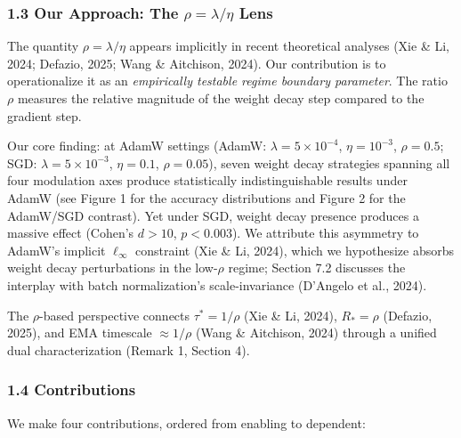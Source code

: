 \documentclass[
]{article}
\begin{document}
\hypertarget{our-approach-the-rho-lambdaeta-lens}{%
\subsubsection{\texorpdfstring{1.3 Our Approach: The
\(\rho = \lambda/\eta\)
Lens}{1.3 Our Approach: The \textbackslash rho = \textbackslash lambda/\textbackslash eta Lens}}\label{our-approach-the-rho-lambdaeta-lens}}

The quantity \(\rho = \lambda/\eta\) appears implicitly in recent
theoretical analyses (Xie \& Li, 2024; Defazio, 2025; Wang \& Aitchison,
2024). Our contribution is to operationalize it as an \emph{empirically
testable regime boundary parameter}. The ratio \(\rho\) measures the
relative magnitude of the weight decay step compared to the gradient
step.

Our core finding: at AdamW settings (AdamW:
\(\lambda = 5 \times 10^{-4}\), \(\eta = 10^{-3}\), \(\rho = 0.5\); SGD:
\(\lambda = 5 \times 10^{-3}\), \(\eta = 0.1\), \(\rho = 0.05\)), seven
weight decay strategies spanning all four modulation axes produce
statistically indistinguishable results under AdamW (see Figure 1 for
the accuracy distributions and Figure 2 for the AdamW/SGD contrast). Yet
under SGD, weight decay presence produces a massive effect (Cohen's
\(d > 10\), \(p < 0.003\)). We attribute this asymmetry to AdamW's
implicit \(\ell_\infty\) constraint (Xie \& Li, 2024), which we
hypothesize absorbs weight decay perturbations in the low-\(\rho\)
regime; Section 7.2 discusses the interplay with batch normalization's
scale-invariance (D'Angelo et al., 2024).

The \(\rho\)-based perspective connects \(\tau^* = 1/\rho\) (Xie \& Li,
2024), \(R_* = \rho\) (Defazio, 2025), and EMA timescale
\(\approx 1/\rho\) (Wang \& Aitchison, 2024) through a unified dual
characterization (Remark 1, Section 4).

\hypertarget{contributions}{%
\subsubsection{1.4 Contributions}\label{contributions}}

We make four contributions, ordered from enabling to dependent:
\end{document}
